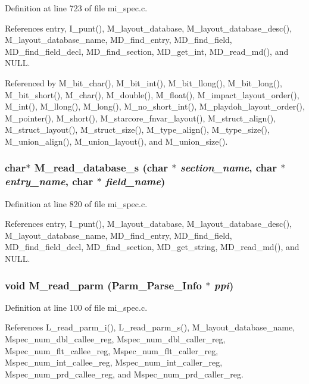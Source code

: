 Definition at line 723 of file mi\_\-spec.c.

References entry, I\_\-punt(), M\_\-layout\_\-database, M\_\-layout\_\-database\_\-desc(), M\_\-layout\_\-database\_\-name, MD\_\-find\_\-entry, MD\_\-find\_\-field, MD\_\-find\_\-field\_\-decl, MD\_\-find\_\-section, MD\_\-get\_\-int, MD\_\-read\_\-md(), and NULL.

Referenced by M\_\-bit\_\-char(), M\_\-bit\_\-int(), M\_\-bit\_\-llong(), M\_\-bit\_\-long(), M\_\-bit\_\-short(), M\_\-char(), M\_\-double(), M\_\-float(), M\_\-impact\_\-layout\_\-order(), M\_\-int(), M\_\-llong(), M\_\-long(), M\_\-no\_\-short\_\-int(), M\_\-playdoh\_\-layout\_\-order(), M\_\-pointer(), M\_\-short(), M\_\-starcore\_\-fnvar\_\-layout(), M\_\-struct\_\-align(), M\_\-struct\_\-layout(), M\_\-struct\_\-size(), M\_\-type\_\-align(), M\_\-type\_\-size(), M\_\-union\_\-align(), M\_\-union\_\-layout(), and M\_\-union\_\-size().
\subsubsection{\setlength{\rightskip}{0pt plus 5cm}char$\ast$ M\_\-read\_\-database\_\-s (char $\ast$ {\em section\_\-name}, char $\ast$ {\em entry\_\-name}, char $\ast$ {\em field\_\-name})}\label{m__spec_8h_4c352760c0bcdb960e445ee83f9820fa}




Definition at line 820 of file mi\_\-spec.c.

References entry, I\_\-punt(), M\_\-layout\_\-database, M\_\-layout\_\-database\_\-desc(), M\_\-layout\_\-database\_\-name, MD\_\-find\_\-entry, MD\_\-find\_\-field, MD\_\-find\_\-field\_\-decl, MD\_\-find\_\-section, MD\_\-get\_\-string, MD\_\-read\_\-md(), and NULL.
\subsubsection{\setlength{\rightskip}{0pt plus 5cm}void M\_\-read\_\-parm (\bf{Parm\_\-Parse\_\-Info} $\ast$ {\em ppi})}\label{m__spec_8h_acde4f0596f233154e1f57b27ecca1a9}




Definition at line 100 of file mi\_\-spec.c.

References L\_\-read\_\-parm\_\-i(), L\_\-read\_\-parm\_\-s(), M\_\-layout\_\-database\_\-name, Mspec\_\-num\_\-dbl\_\-callee\_\-reg, Mspec\_\-num\_\-dbl\_\-caller\_\-reg, Mspec\_\-num\_\-flt\_\-callee\_\-reg, Mspec\_\-num\_\-flt\_\-caller\_\-reg, Mspec\_\-num\_\-int\_\-callee\_\-reg, Mspec\_\-num\_\-int\_\-caller\_\-reg, Mspec\_\-num\_\-prd\_\-callee\_\-reg, and Mspec\_\-num\_\-prd\_\-caller\_\-reg.
